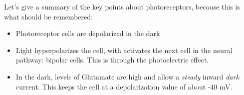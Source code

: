 Let's give a summary of the key points about photoreceptors, because this is what should be remembered: 

\begin{itemize}
    \item Photoreceptor cells are depolarized in the dark
    \item Light hyperpolarizes the cell, with activates the next cell in the neural pathway: bipolar cells. This is through the photoelectric effect.
    \item In the dark, levels of Glutamate are high and allow a \textit{steady} inward \textit{dark} current. This keeps the cell at a depolarization value of about -40 mV. 
\end{itemize}
